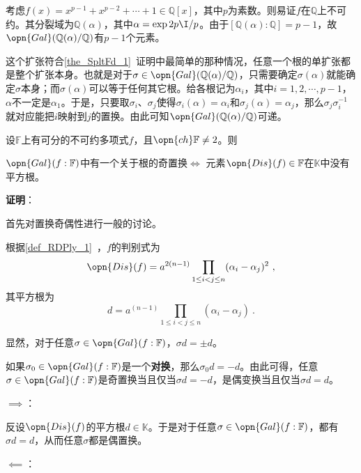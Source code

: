 \begin{example}{}
考虑$f(x)=x^{p-1}+x^{p-2}+\cdots+1\in\mathbb{Q}[x]$，其中$p$为素数。则易证$f$在$\mathbb{Q}$上不可约。其分裂域为$\mathbb{Q}(\alpha)$，其中$\alpha=\exp{2p\I/p}$。由于$[\mathbb{Q}(\alpha):\mathbb{Q}]=p-1$，故$\opn{Gal}(\mathbb{Q}(\alpha)/\mathbb{Q})$有$p-1$个元素。

这个扩张符合\autoref{the_SpltFd_1}~证明中最简单的那种情况，任意一个根的单扩张都是整个扩张本身。也就是对于$\sigma\in\opn{Gal}(\mathbb{Q}(\alpha)/\mathbb{Q})$，只需要确定$\sigma(\alpha)$就能确定$\sigma$本身；而$\sigma(\alpha)$可以等于任何其它根。给各根记为$\alpha_i$，其中$i=1, 2, \cdots, p-1$，$\alpha$不一定是$\alpha_1$。于是，只要取$\sigma_i$、$\sigma_j$使得$\sigma_i(\alpha)=\alpha_i$和$\sigma_j(\alpha)=\alpha_j$，那么$\sigma_j\sigma_i^{-1}$就对应能把$i$映射到$j$的置换。由此可知$\opn{Gal}(\mathbb{Q}(\alpha)/\mathbb{Q})$可递。
\end{example}


\begin{theorem}{}
设$\mathbb{F}$上有可分的不可约多项式$f$，且$\opn{ch}\mathbb{F}\neq 2$。则

$\opn{Gal}(f:\mathbb{F})$中有一个关于根的奇置换$\iff$ 元素$\opn{Dis}(f)\in\mathbb{F}$在$\mathbb{K}$中没有平方根。
\end{theorem}

\textbf{证明}：

首先对置换奇偶性进行一般的讨论。

根据\autoref{def_RDPly_1}~，$f$的判别式为
\begin{equation}
\opn{Dis}(f) = a^{2(n-1)}\prod_{1\leq i<j\leq n}(\alpha_i-\alpha_j)^2~,
\end{equation}
其平方根为
\begin{equation}
d = a^{(n-1)}\prod_{1\leq i<j\leq n}(\alpha_i-\alpha_j)~.
\end{equation}

显然，对于任意$\sigma\in\opn{Gal}(f:\mathbb{F})$，$\sigma d=\pm d$。

如果$\sigma_0\in\opn{Gal}(f:\mathbb{F})$是一个\textbf{对换}，那么$\sigma_0 d=-d$。由此可得，任意$\sigma\in\opn{Gal}(f:\mathbb{F})$是奇置换当且仅当$\sigma d=-d$，是偶变换当且仅当$\sigma d=d$。

$\implies$：

反设$\opn{Dis}(f)$的平方根$d\in\mathbb{K}$。于是对于任意$\sigma\in\opn{Gal}(f:\mathbb{F})$，都有$\sigma d = d$，从而任意$\sigma$都是偶置换。

$\impliedby$：

